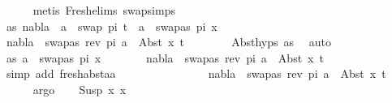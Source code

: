 \begin{isabellebody}
\ \ \ \ \isamarkupfalse%
\ {\isacharparenleft}{\kern0pt}metis\ Fresh{\isacharunderscore}{\kern0pt}elims{\isacharparenleft}{\kern0pt}{}{\isacharparenright}{\kern0pt}\ swap{\isachardot}{\kern0pt}simps{\isacharparenleft}{\kern0pt}{}{\isacharparenright}{\kern0pt}{\isacharparenright}{\kern0pt}\isanewline
\ \ \isamarkupfalse%
\ \isacommand{{\isacharbraceleft}{\kern0pt}}\isamarkupfalse%
\isanewline
\ \ \ \ \isamarkupfalse%
\ as{\isacharcolon}{\kern0pt}\ {\isachardoublequoteopen}nabla\ {\isasymturnstile}\ a\ {\isasymsharp}\ swap\ pi\ t\ {\isasymand}\ a\ {\isasymnoteq}\ swapas\ pi\ x{}{\isachardoublequoteclose}\ \isanewline
\ \ \ \ \isamarkupfalse%
\ {\isachardoublequoteopen}nabla\ {\isasymturnstile}\ swapas\ {\isacharparenleft}{\kern0pt}rev\ pi{\isacharparenright}{\kern0pt}\ a\ {\isasymsharp}\ Abst\ x{}\ t{\isachardoublequoteclose}\isanewline
\ \ \ \ \ \ \isamarkupfalse%
\ Abst{\isachardot}{\kern0pt}hyps\ as\ \isamarkupfalse%
\ auto\ \isanewline
\ \ \isacommand{{\isacharbraceright}{\kern0pt}}\isamarkupfalse%
\isanewline
\ \ \isamarkupfalse%
\ \isacommand{{\isacharbraceleft}{\kern0pt}}\isamarkupfalse%
\isanewline
\ \ \ \ \isamarkupfalse%
\ as{\isacharcolon}{\kern0pt}\ {\isachardoublequoteopen}a\ {\isacharequal}{\kern0pt}\ swapas\ pi\ x{}{\isachardoublequoteclose}\isanewline
\ \ \ \ \isamarkupfalse%
\ \isamarkupfalse%
\ {\isachardoublequoteopen}nabla\ {\isasymturnstile}\ swapas\ {\isacharparenleft}{\kern0pt}rev\ pi{\isacharparenright}{\kern0pt}\ a\ {\isasymsharp}\ Abst\ x{}\ t{\isachardoublequoteclose}\isanewline
\ \ \ \ \ \ \isamarkupfalse%
\ {\isacharparenleft}{\kern0pt}simp\ add{\isacharcolon}{\kern0pt}\ fresh{\isacharunderscore}{\kern0pt}abst{\isacharunderscore}{\kern0pt}aa{\isacharparenright}{\kern0pt}\ \ \ \ \ \ \isanewline
\ \ \isacommand{{\isacharbraceright}{\kern0pt}}\isamarkupfalse%
\ \isanewline
\ \ \isamarkupfalse%
\ \isamarkupfalse%
\ {\isachardoublequoteopen}nabla\ {\isasymturnstile}\ swapas\ {\isacharparenleft}{\kern0pt}rev\ pi{\isacharparenright}{\kern0pt}\ a\ {\isasymsharp}\ Abst\ x{}\ t{\isachardoublequoteclose}\ \isanewline
\ \ \ \ \isamarkupfalse%
\ argo\isanewline
{}\isamarkupfalse%
\isanewline
\ \ \isamarkupfalse%
\ {\isacharparenleft}{\kern0pt}Susp\ x{}\ x{}{\isacharparenright}{\kern0pt}\isanewline

\end{isabellebody}

